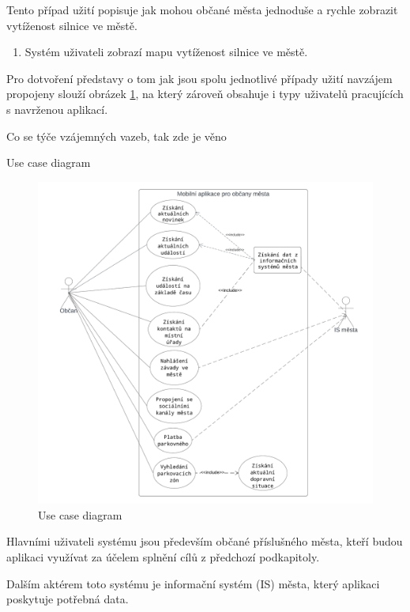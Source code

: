 Tento případ užití popisuje jak mohou občané města jednoduše a rychle zobrazit vytíženost silnice ve městě.

\begin{enumerate}
  \item Systém uživateli zobrazí mapu vytíženost silnice ve městě.
\end{enumerate}

Pro dotvoření představy o tom jak jsou spolu jednotlivé případy užití navzájem propojeny slouží obrázek \ref{fig:use_case_diagram}, na který zároveň 
obsahuje i typy uživatelů pracujících s navrženou aplikací.

Co se týče vzájemných vazeb, tak zde je věno

Use case diagram
\begin{figure}[H]
  \centering
  \includegraphics[width=.99\textwidth]{Use case diagram.png}
  \caption{Use case diagram}
  \label{fig:use_case_diagram}
\end{figure}

Hlavními uživateli systému jsou především občané příslušného města, kteří budou aplikaci využívat za účelem splnění cílů z předchozí podkapitoly.

Dalším aktérem toto systému je informační systém (IS) města, který aplikaci poskytuje potřebná data.

